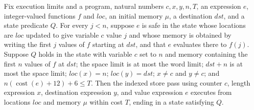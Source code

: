 \begin{theorem}
\label{Light.Ends.pass}
\leanok
{}
Fix execution limits and a program, natural numbers $c,x,y,n,T$, an expression $e$,
integer-valued functions $f$ and $loc$, an initial memory $\mu$, a destination $dst$,
and a state predicate $Q$. For every $j<n$, suppose $e$ is safe in the state whose
locations are $loc$ updated to give variable $c$ value $j$ and whose memory is obtained
by writing the first $j$ values of $f$ starting at $dst$, and that $e$ evaluates there
to $f(j)$. Suppose $Q$ holds in the state with variable $c$ set to $n$ and memory
containing the first $n$ values of $f$ at $dst$; the space limit is at most the word
limit; $dst+n$ is at most the space limit; $loc(x)=n$; $loc(y)=dst$; $x\ne c$ and $y\ne
c$; and $n(\operatorname{cost}(e)+12)+6\le T$. Then the indexed store pass using counter
$c$, length expression $x$, destination expression $y$, and value expression $e$
executes from locations $loc$ and memory $\mu$ within cost $T$, ending in a state
satisfying $Q$.
\end{theorem}
